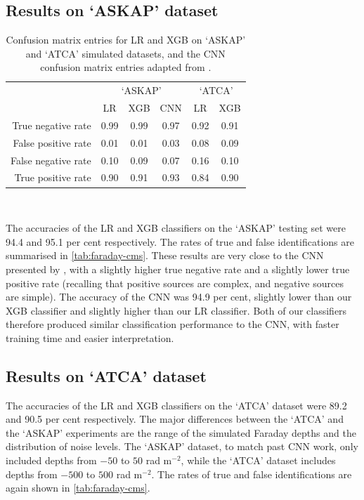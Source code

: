   \subsection{Results on `ASKAP' dataset}
  \label{sec:faraday-cnn-comparison}

    \begin{table}[htbp]
      \caption{\label{tab:faraday-cms} Confusion matrix entries for LR and XGB on `ASKAP' and `ATCA' simulated datasets, and the CNN confusion matrix entries adapted from \citet{brown_classifying_2018}.}
      \centering
      \begin{tabular}{r|ccc|cc}
        \hline\hline
        & \multicolumn{3}{c}{`ASKAP'} & \multicolumn{2}{c}{`ATCA'} \\
        & LR & XGB & CNN & LR & XGB \\
        \hline
        True negative rate & 0.99 & 0.99 & 0.97 & 0.92 & 0.91\\
        False positive rate & 0.01 & 0.01 & 0.03 & 0.08 & 0.09\\
        False negative rate & 0.10 & 0.09 & 0.07 & 0.16 & 0.10\\
        True positive rate & 0.90 & 0.91 & 0.93 & 0.84 & 0.90\\
        \hline\hline
      \end{tabular}\\
    \end{table}

    The accuracies of the LR and XGB classifiers on the `ASKAP' testing set were 94.4 and 95.1 per cent respectively. The rates of true and false identifications are summarised in \autoref{tab:faraday-cms}. These results are very close to the CNN presented by \citet{brown_classifying_2018}, with a slightly higher true negative rate and a slightly lower true positive rate (recalling that positive sources are complex, and negative sources are simple). The accuracy of the CNN was 94.9 per cent, slightly lower than our XGB classifier and slightly higher than our LR classifier. Both of our classifiers therefore produced similar classification performance to the CNN, with faster training time and easier interpretation.

  \subsection{Results on `ATCA' dataset}
  \label{sec:faraday-results-simulated}

    The accuracies of the LR and XGB classifiers on the `ATCA' dataset were 89.2 and 90.5 per cent respectively. The major differences between the `ATCA' and the `ASKAP' experiments are the range of the simulated Faraday depths and the distribution of noise levels. The `ASKAP' dataset, to match past CNN work, only included depths from $-50$ to $50$ rad m$^{-2}$, while the `ATCA' dataset includes depths from $-500$ to $500$ rad m$^{-2}$. The rates of true and false identifications are again shown in \autoref{tab:faraday-cms}.

